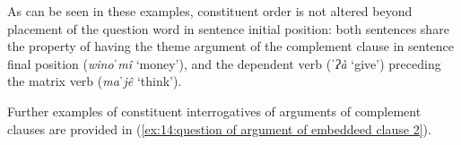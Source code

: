     \label{ex:14:question of argument of embedded clausea}
        \label{ex:14:question of argument of embedded clauseb}
    \z
\z

As can be seen in these examples, constituent order is not altered beyond placement of the question word in sentence initial position: both sentences share the property of having the theme argument of the complement clause in sentence final position (\textit{winoˈmî} `money'), and the dependent verb (\textit{ˈʔà} `give') preceding the matrix verb (\textit{maˈjê} `think').

Further examples of constituent interrogatives of arguments of complement clauses are provided in (\ref{ex:14:question of argument of embeddeed clause 2}).


